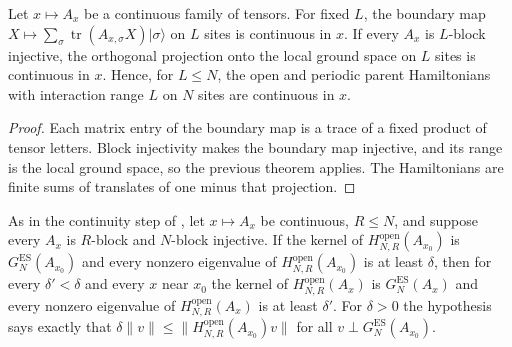 \begin{lemma}
    \label{thm:continuous_finite_window_parent_hamiltonian}
    \leanok
    Let $x\mapsto A_x$ be a continuous family of tensors. For fixed $L$, the
    boundary map $X\mapsto\sum_\sigma\operatorname{tr}(A_{x,\sigma}X)\lvert\sigma\rangle$
    on $L$ sites is continuous in $x$. If every $A_x$ is $L$-block injective,
    the orthogonal projection onto the local ground space on $L$ sites is
    continuous in $x$. Hence, for $L\leq N$, the open and periodic parent
    Hamiltonians with interaction range $L$ on $N$ sites are continuous in $x$.
\end{lemma}

\begin{proof}
    \leanok
    Each matrix entry of the boundary map is a trace of a fixed product of
    tensor letters. Block injectivity makes the boundary map injective, and its
    range is the local ground space, so the previous theorem applies. The
    Hamiltonians are finite sums of translates of one minus that projection.
\end{proof}

\begin{lemma}
    \label{thm:open_parent_gap_continuity}
    \leanok
    As in the continuity step of \cite[lines~2575--2578]{Schuch2011Phases},
    let $x\mapsto A_x$ be continuous, $R\leq N$, and suppose every $A_x$ is
    $R$-block and $N$-block injective. If the kernel of
    $H^{\mathrm{open}}_{N,R}(A_{x_0})$ is $G_N^{\mathrm{ES}}(A_{x_0})$ and every
    nonzero eigenvalue of $H^{\mathrm{open}}_{N,R}(A_{x_0})$ is at least $\delta$,
    then for every $\delta'<\delta$ and every $x$ near $x_0$ the kernel of
    $H^{\mathrm{open}}_{N,R}(A_x)$ is $G_N^{\mathrm{ES}}(A_x)$ and every nonzero
    eigenvalue of $H^{\mathrm{open}}_{N,R}(A_x)$ is at least $\delta'$. For
    $\delta>0$ the hypothesis says exactly that
    $\delta\lVert v\rVert\leq\lVert H^{\mathrm{open}}_{N,R}(A_{x_0})v\rVert$ for
    all $v\perp G_N^{\mathrm{ES}}(A_{x_0})$.
\end{lemma}

